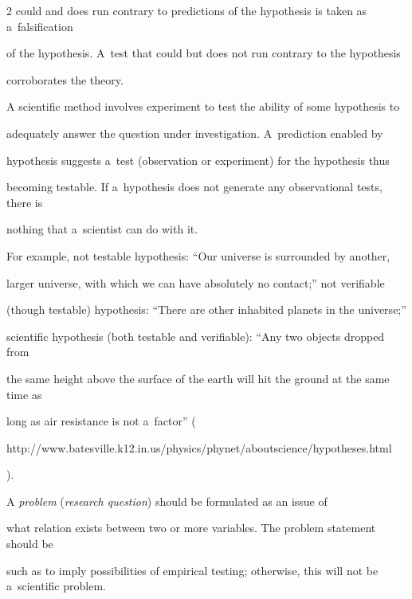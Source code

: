 \begin{multicols}{2}
could and does run contrary to predictions of the hypothesis is taken as a~falsification


of the hypothesis. A~test that could but does not run contrary to the hypothesis


corroborates the theory.


{





}





  A scientific method involves experiment to test the ability of some hypothesis to


adequately answer the question under investigation. A~prediction enabled by


hypothesis suggests a~test (observation or experiment) for the hypothesis thus


becoming testable. If a~hypothesis does not generate any observational tests, there is


nothing that a~scientist can do with it.





  For example, not testable hypothesis: ``Our universe is surrounded by another,


larger universe, with which we can have absolutely no contact;'' not verifiable


(though testable) hypothesis: ``There are other inhabited planets in the universe;''


scientific hypothesis (both testable and verifiable):  ``Any two objects dropped from


the same height above the surface of the earth will hit the ground at the same time as


long as air resistance is not a~factor'' ({\sf


http://www.batesville.k12.in.us/physics/phynet/\linebreak aboutscience/hypotheses.html}).





  A \textit{problem} (\textit{research question}) should be formulated as an issue of


what relation exists between two or more variables. The problem statement should be


such as to imply possibilities of empirical testing; otherwise, this will not be a~scientific problem.



\end{multicols}
